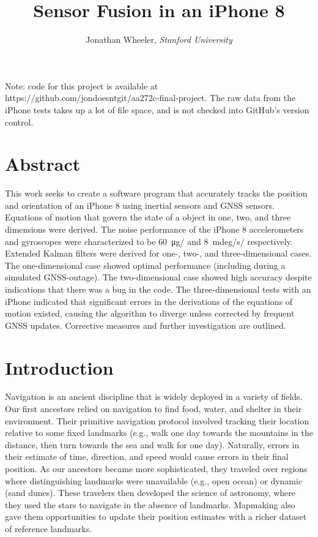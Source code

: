 \documentclass[10pt]{article}
\title{\textbf{Sensor Fusion in an iPhone 8}}
\author{Jonathan Wheeler, \textit{Stanford University}}
\date{}
\begin{document}
\maketitle

Note: code for this project is available at https://github.com/jondoesntgit/aa272c-final-project. The raw data from the iPhone tests takes up a lot of file space, and is not checked into GitHub's version control.

\section{Abstract}

This work seeks to create a software program that accurately tracks the position and orientation of an iPhone 8 using inertial sensors and GNSS sensors. Equations of motion that govern the state of a object in one, two, and three dimensions were derived. The noise performance of the iPhone 8 accelerometers and gyroscopes were characterized to be \SI{60}{\micro g/} and \SI{8}{mdeg/s/} respectively. Extended Kalman filters were derived for one-, two-, and three-dimensional cases. The one-dimensional case showed optimal performance (including during a simulated GNSS-outage). The two-dimensional case showed high accuracy despite indications that there was a bug in the code. The three-dimensional tests with an iPhone indicated that significant errors in the derivations of the equations of motion existed, causing the algorithm to diverge unless corrected by frequent GNSS updates. Corrective measures and further investigation are outlined.
\section{Introduction}

Navigation is an ancient discipline that is widely deployed in a variety of fields. Our first ancestors relied on navigation to find food, water, and shelter in their environment. Their primitive navigation protocol involved tracking their location relative to some fixed landmarks (e.g., walk one day towards the mountains in the distance, then turn towards the sea and walk for one day). Naturally, errors in their estimate of time, direction, and speed would cause errors in their final position. As our ancestors became more sophisticated, they traveled over regions where distinguishing landmarks were unavailable (e.g., open ocean) or dynamic (sand dunes). These travelers then developed the science of astronomy, where they used the stars to navigate in the absence of landmarks. Mapmaking also gave them opportunities to update their position estimates with a richer dataset of reference landmarks.
  
\end{document}

